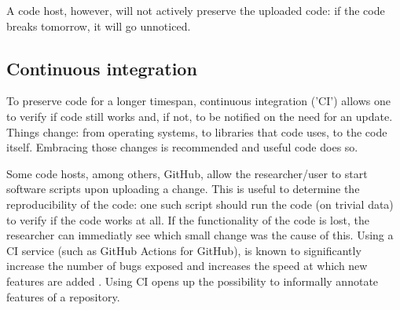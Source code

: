 A code host, however, will not actively preserve the uploaded code:
if the code breaks tomorrow, it will go unnoticed.

\subsection{Continuous integration}

To preserve code for a longer timespan, 
continuous integration ('CI') allows one to 
verify if code still works and, if not, to be notified on the need for an update.
Things change: from operating systems, to libraries that code uses,
to the code itself. 
Embracing those changes is recommended \cite{beck2000extreme} 
and useful code does so.


Some code hosts, among others, GitHub, 
allow the researcher/user to start software scripts upon uploading a change.
This is useful to determine the reproducibility of the code: 
one such script should run the code (on trivial data) 
to verify if the code works at all.
If the functionality of the code is lost, the researcher
can immediatly see which small change was the cause of this.
Using a CI service (such as GitHub Actions for GitHub), 
is known to significantly 
increase the number of bugs exposed \cite{vasilescu2015} and increases
the speed at which new features are added \cite{vasilescu2015}.
Using CI opens up the possibility to informally annotate features of
a repository. 


